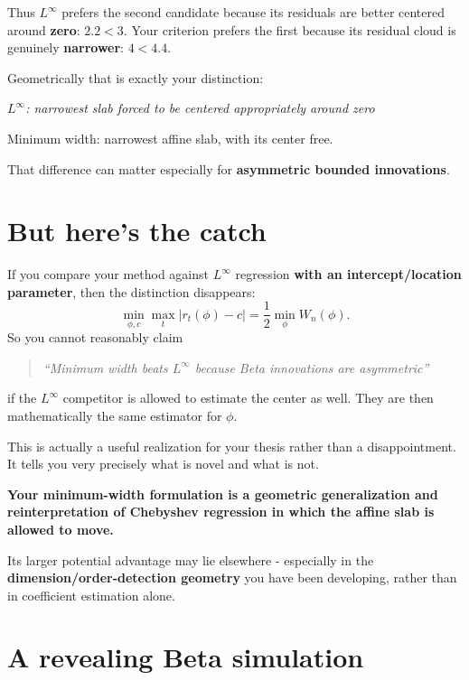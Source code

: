 \documentclass[10pt,a4paper]{article}
\begin{document}
Thus $L^\infty$ prefers the second candidate because its residuals are better centered around \textbf{zero}: $2.2<3$. Your criterion prefers the first because its residual cloud is genuinely \textbf{narrower}: $4<4.4$.

Geometrically that is exactly your distinction:

\begin{contrastbox}
\itshape
$L^\infty$: narrowest slab forced to be centered appropriately around zero

Minimum width: narrowest affine slab, with its center free.
\end{contrastbox}

That difference can matter especially for \textbf{asymmetric bounded innovations}.

\section*{But here's the catch}

If you compare your method against $L^\infty$ regression \textbf{with an intercept/location parameter}, then the distinction disappears:
\[
\min_{\phi,c}\max_t\lvert r_t(\phi)-c\rvert
=\frac12\min_\phi W_n(\phi).
\]
So you cannot reasonably claim

\begin{quote}\itshape
``Minimum width beats $L^\infty$ because Beta innovations are asymmetric''
\end{quote}

if the $L^\infty$ competitor is allowed to estimate the center as well. They are then mathematically the same estimator for $\phi$.

This is actually a useful realization for your thesis rather than a disappointment. It tells you very precisely what is novel and what is not.

\begin{keybox}
\centering\sffamily\bfseries\color{navy}
Your minimum-width formulation is a geometric generalization and reinterpretation of Chebyshev regression in which the affine slab is allowed to move.
\end{keybox}

Its larger potential advantage may lie elsewhere - especially in the\\
\textbf{dimension/order-detection geometry} you have been developing,
rather than in coefficient estimation alone.

\section*{A revealing Beta simulation}
\end{document}
